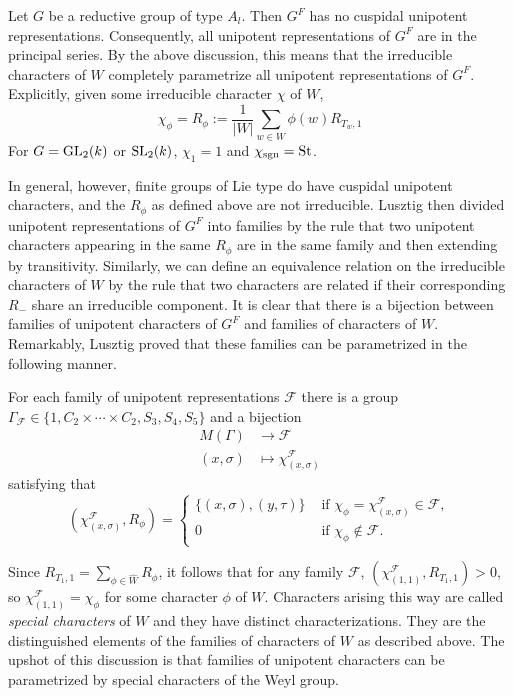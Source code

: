 \begin{example}
    Let $G$ be a reductive group of type $A_l$. Then $G^F$ has no cuspidal unipotent representations. Consequently, all unipotent representations of $G^F$ are in the principal series. By the above discussion, this means that the irreducible characters of $W$ completely parametrize all unipotent representations of $G^F$. Explicitly, given some irreducible character $\chi$ of $W$, 
    \begin{equation*}
        \chi_\phi=R_\phi:=\frac{1}{|W|}\sum_{w\in W}\phi(w)R_{T_w,1}
    \end{equation*}
    For $G=\mathrm{GL}_2(k)$ or $\mathrm{SL}_2(k)$, $\chi_1=1$ and $\chi_{\mathrm{sgn}}=\mathrm{St}$.
\end{example}

In general, however, finite groups of Lie type do have cuspidal unipotent characters, and the $R_\phi$ as defined above are not irreducible. Lusztig then divided unipotent representations of $G^F$ into families by the rule that two unipotent characters appearing in the same $R_\phi$ are in the same family and then extending by transitivity. Similarly, we can define an equivalence relation on the irreducible characters of $W$ by the rule that two characters are related if their corresponding $R_{-}$ share an irreducible component. It is clear that there is a bijection between families of unipotent characters of $G^F$ and families of characters of $W$. Remarkably, Lusztig proved that these families can be parametrized in the following manner. 

\begin{theorem}
    For each family of unipotent representations $\mathcal{F}$ there is a group $\Gamma_\mathcal{F}\in\{1,C_2\times\cdots\times C_2,S_3,S_4,S_5\}$
    and a bijection 
    \begin{align*}
        M(\Gamma)&\longrightarrow\mathcal{F}\\
        (x,\sigma)&\longmapsto\chi_{(x,\sigma)}^\mathcal{F}
    \end{align*}
    satisfying that 
    \begin{equation*}
        (\chi_{(x,\sigma)}^\mathcal{F},R_\phi)=\begin{cases}
            \{(x,\sigma),(y,\tau)\} & \text{ if } \chi_\phi=\chi_{(x,\sigma)}^\mathcal{F}\in\mathcal{F},\\
            0 & \text{ if }\chi_\phi\not\in\mathcal{F}.
        \end{cases}
    \end{equation*}
\end{theorem}
Since $R_{T_1,1}=\sum_{\phi\in\hat{W}}R_\phi$, it follows that for any family $\mathcal{F}$, $(\chi_{(1,1)}^\mathcal{F},R_{T_1,1})>0$, so $\chi_{(1,1)}^\mathcal{F}=\chi_\phi$ for some character $\phi$ of $W$. Characters arising this way are called \textit{special characters} of $W$ and they have distinct characterizations. They are the distinguished elements of the families of characters of $W$ as described above. The upshot of this discussion is that families of unipotent characters can be parametrized by special characters of the Weyl group. 


